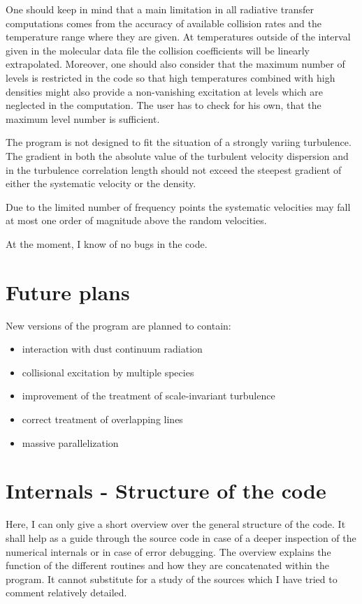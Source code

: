 One should keep in mind that a main limitation in all radiative 
transfer computations comes from the accuracy of available
collision rates and the temperature range where they are given.
At temperatures outside of the interval given in the molecular data
file the collision coefficients will be linearly extrapolated.  
Moreover, one should also consider that the maximum number of levels
is restricted in the code so that high temperatures combined with
high densities might also
provide a non-vanishing excitation at levels which are neglected
in the computation. The user has to check for his own, that the 
maximum level number is sufficient.

The program is not designed to fit the situation of a strongly variing 
turbulence. The gradient in both the absolute value of the turbulent 
velocity dispersion and in the turbulence correlation length should 
not exceed the steepest gradient of either 
the systematic velocity or the density. 

Due to the limited number of frequency points the systematic velocities 
may fall at most one order of magnitude above the random velocities.

At the moment, I know of no bugs in the code.

\section{Future plans}

New versions of the program are planned to contain:
\begin{itemize}
\item{} interaction with dust continuum radiation
\item{} collisional excitation by multiple species
\item{} improvement of the treatment of scale-invariant turbulence 
\item{} correct treatment of overlapping lines
\item{} massive parallelization
\end{itemize}

\section{Internals - Structure of the code}

Here, I can only give a short overview over the general structure of
the code. It shall help as a guide through the source code in case
of a deeper inspection of the numerical internals or in case of
error debugging. The overview explains the function of the different
routines and how they are concatenated within the program. It cannot
substitute for a study of the sources which I have tried to comment
relatively detailed.

